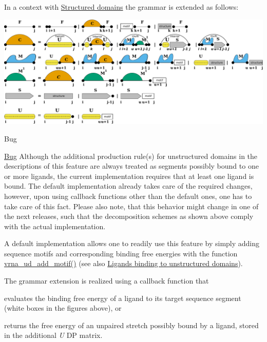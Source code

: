 In a context with \hyperlink{group__domains__struc}{Structured domains} the grammar is extended as follows\+:

 
\begin{DoxyImageNoCaption}
  \mbox{\includegraphics[width=\textwidth,height=\textheight/2,keepaspectratio=true]{GCrecursion}}
\end{DoxyImageNoCaption}


\begin{DoxyRefDesc}{Bug}
\item[\hyperlink{bug__bug000002}{Bug}]Although the additional production rule(s) for unstructured domains in the descriptions of this feature are always treated as \textquotesingle{}segments possibly bound to one or more ligands\textquotesingle{}, the current implementation requires that at least one ligand is bound. The default implementation already takes care of the required changes, however, upon using callback functions other than the default ones, one has to take care of this fact. Please also note, that this behavior might change in one of the next releases, such that the decomposition schemes as shown above comply with the actual implementation.\end{DoxyRefDesc}


A default implementation allows one to readily use this feature by simply adding sequence motifs and corresponding binding free energies with the function \hyperlink{group__domains__up_gaec0c3313fb2951946614f920d289829a}{vrna\+\_\+ud\+\_\+add\+\_\+motif()} (see also \hyperlink{group__ligands__up}{Ligands binding to unstructured domains}).

The grammar extension is realized using a callback function that
\begin{DoxyItemize}
\item evaluates the binding free energy of a ligand to its target sequence segment (white boxes in the figures above), or
\item returns the free energy of an unpaired stretch possibly bound by a ligand, stored in the additional {\itshape U} DP matrix.
\end{DoxyItemize}

